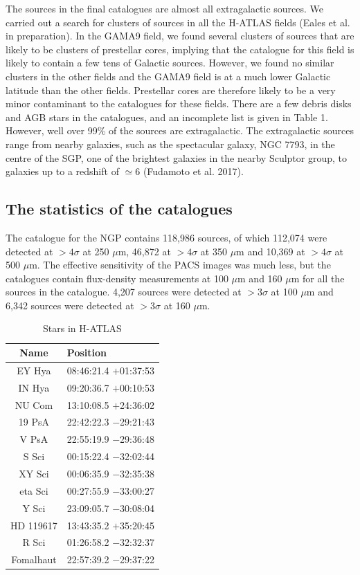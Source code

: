 \documentclass[useAMS,usenatbib]{mnras}
\begin{document}
The sources in the final catalogues are almost all extragalactic
sources. We carried out a search for clusters of sources in all the
H-ATLAS fields (Eales et al. in preparation).  In the GAMA9 field, we
found several clusters of sources that are likely to be clusters of
prestellar cores, implying that the catalogue for this field is likely
to contain a few tens of Galactic sources.  However, we found no
similar clusters in the other fields and the GAMA9 field is at a much
lower Galactic latitude than the other fields. Prestellar cores are
therefore likely to be a very minor contaminant to the catalogues for
these fields. There are a few debris disks and AGB stars in the
catalogues, and an incomplete list is given in Table 1.  However, well
over 99\% of the sources are extragalactic. The extragalactic sources
range from nearby galaxies, such as the spectacular galaxy, NGC 7793,
in the centre of the SGP, one of the brightest galaxies in the nearby
Sculptor group, to galaxies up to a redshift of $\simeq$6 (Fudamoto et
al. 2017).

\subsection{The statistics of the catalogues}

The catalogue for the NGP contains 118,986 sources, of which 112,074
were detected at $>4\sigma$ at 250 $\mu$m, 46,872 at $>4\sigma$ at 350
$\mu$m and 10,369 at $>4\sigma$ at 500 $\mu$m. The effective
sensitivity of the PACS images was much less, but the catalogues
contain flux-density measurements at 100 $\mu$m and 160 $\mu$m for all
the sources in the catalogue. 4,207 sources were detected at
$>3\sigma$ at 100 $\mu$m and 6,342 sources were detected at $>3\sigma$
at 160 $\mu$m.


\begin{table}
\caption{Stars in H-ATLAS}
\begin{tabular}{cl}
\hline
Name & Position \\
\hline
EY Hya & 08:46:21.4 $+$01:37:53 \\
IN Hya & 09:20:36.7 $+$00:10:53 \\
NU Com & 13:10:08.5 $+$24:36:02 \\
19 PsA & 22:42:22.3 $-$29:21:43 \\
V PsA & 22:55:19.9  $-$29:36:48 \\
S Sci & 00:15:22.4 $-$32:02:44 \\
XY Sci & 00:06:35.9 $-$32:35:38 \\
eta Sci & 00:27:55.9 $-$33:00:27 \\
Y Sci & 23:09:05.7 $-$30:08:04 \\
HD 119617 & 13:43:35.2 $+$35:20:45 \\
R Sci & 01:26:58.2 $-$32:32:37 \\
Fomalhaut & 22:57:39.2 $-$29:37:22 \\
\hline
\end{tabular}
\end{table}
\end{document}

